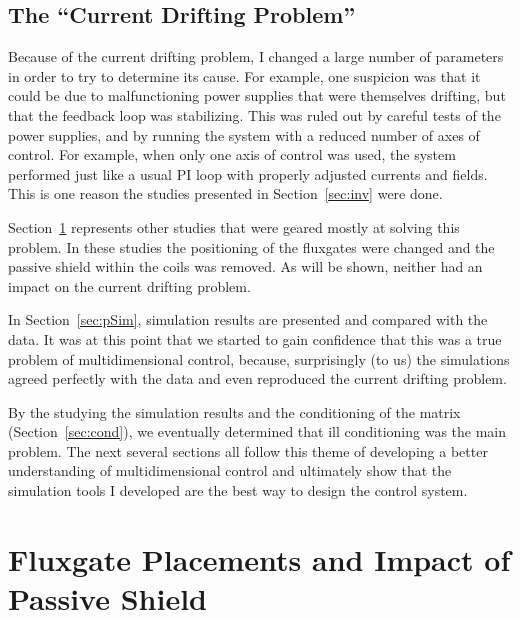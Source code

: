 \subsection{The ``Current Drifting Problem''}

Because of the current drifting problem, I changed a large number of
parameters in order to try to determine its cause.  For example, one
suspicion was that it could be due to malfunctioning power supplies
that were themselves drifting, but that the feedback loop was
stabilizing.  This was ruled out by careful tests of the power
supplies, and by running the system with a reduced number of axes of
control.  For example, when only one axis of control was used, the
system performed just like a usual PI loop with properly adjusted
currents and fields.  This is one reason the studies presented in
Section~\ref{sec:inv} were done.

Section~\ref{sec:flux_place} represents other studies that were geared
mostly at solving this problem.  In these studies the positioning of
the fluxgates were changed and the passive shield within the coils was
removed.  As will be shown, neither had an impact on the current
drifting problem.

In Section~\ref{sec:pSim}, simulation results are presented and
compared with the data.  It was at this point that we started to gain
confidence that this was a true problem of multidimensional control,
because, surprisingly (to us) the simulations agreed perfectly with
the data and even reproduced the current drifting problem.

By the studying the simulation results and the conditioning of the
matrix (Section~\ref{sec:cond}), we eventually determined that
ill conditioning was the main problem.  The next several sections all
follow this theme of developing a better understanding of
multidimensional control and ultimately show that the simulation tools
I developed are the best way to design the control system.


\section{Fluxgate Placements and Impact of Passive Shield}\label{sec:flux_place}



